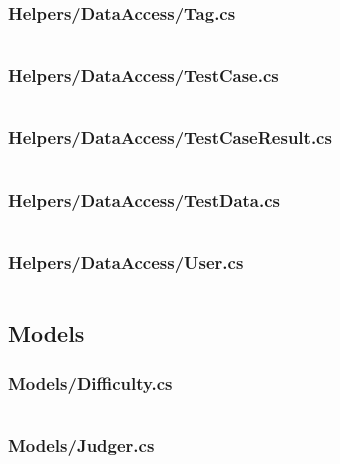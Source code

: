 \documentclass[a4paper]{report}
\begin{document}
\subsubsection{Helpers/DataAccess/Tag.cs}

\inputminted{csharp}{"../src/Algorithm Dynamics.Core/Helpers/DataAccess/Tag.cs"}

\subsubsection{Helpers/DataAccess/TestCase.cs}

\inputminted{csharp}{"../src/Algorithm Dynamics.Core/Helpers/DataAccess/TestCase.cs"}

\subsubsection{Helpers/DataAccess/TestCaseResult.cs}

\inputminted{csharp}{"../src/Algorithm Dynamics.Core/Helpers/DataAccess/TestCaseResult.cs"}

\subsubsection{Helpers/DataAccess/TestData.cs}

\inputminted{csharp}{"../src/Algorithm Dynamics.Core/Helpers/DataAccess/TestData.cs"}

\subsubsection{Helpers/DataAccess/User.cs}

\inputminted{csharp}{"../src/Algorithm Dynamics.Core/Helpers/DataAccess/User.cs"}

\subsection{Models}

\subsubsection{Models/Difficulty.cs}

\inputminted{csharp}{"../src/Algorithm Dynamics.Core/Models/Difficulty.cs"}

\subsubsection{Models/Judger.cs}
\end{document}
